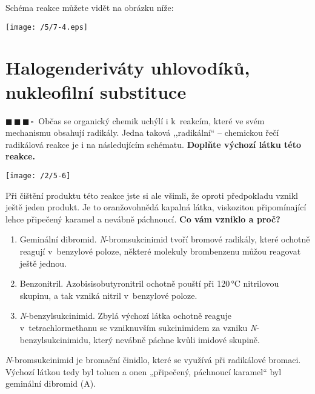 \documentclass{book}
\newcommand{\tri}{$\blacksquare \, \blacksquare \, \blacksquare \, \square \; \; $}
\renewenvironment{quotation}{\par}{\par} %
\begin{document}
Schéma reakce můžete vidět na obrázku níže:

\begin{center}
\texttt{[image: /5/7-4.eps]}
\end{center}

\section{Halogenderiváty uhlovodíků, nukleofilní substituce}

\begin{quotation}
\tri Občas se organický chemik uchýlí i k~reakcím, které ve svém mechanismu obsahují radikály. Jedna taková ,,radikální`` -- chemickou řečí radikálová reakce je i na následujícím schématu. \textbf{Doplňte výchozí látku této reakce.}

\begin{center}
\texttt{[image: /2/5-6]}
\end{center}

Při čištění produktu této reakce jste si ale všimli, že oproti předpokladu
vznikl ještě jeden produkt. Je to oranžovohnědá kapalná látka, viskozitou
připomínající lehce připečený karamel a nevábně páchnoucí. \textbf{Co vám vzniklo a proč?}

\begin{enumerate}[label=\Alph*)]
\item Geminální dibromid. \textit{N}-bromsukcinimid
tvoří bromové radikály, které ochotně reagují v~benzylové poloze, některé molekuly brombenzenu můžou reagovat ještě jednou.
\item Benzonitril. Azobisisobutyronitril ochotně pouští při 120\,°C nitrilovou
skupinu, a tak vzniká nitril v~benzylové poloze. 
\item \textit{N}-benzylsukcinimid. Zbylá výchozí látka ochotně reaguje v~tetrachlormethanu se vzniknuvším sukcinimidem za vzniku \textit{N}-benzylsukcinimidu,
který nevábně páchne kvůli imidové skupině.
\end{enumerate}
\end{quotation} \dotfill \par 
\textit{N}-bromsukcinimid je bromační činidlo, které se využívá při radikálové bromaci. Výchozí látkou tedy byl toluen a onen „připečený, páchnoucí karamel“ byl geminální dibromid (A).
\end{document}
